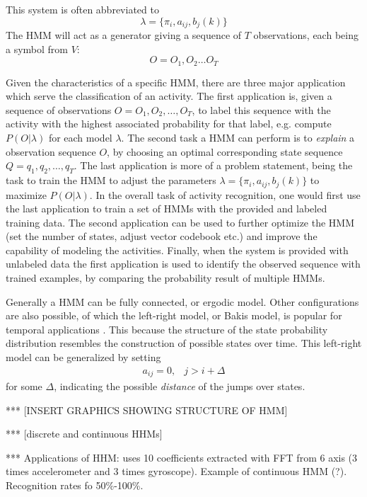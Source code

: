 This system is often abbreviated to
\begin{equation}
	\lambda = \{ \pi_i, a_{ij}, b_j(k)\}
\end{equation}
The HMM will act as a generator giving a sequence of $T$ observations, each being a symbol from $V$:
\begin{equation}
	O = O_1, O_2 \dots O_T
\end{equation}

Given the characteristics of a specific HMM, there are three major application which serve the classification of an activity.
The first application is, given a sequence of observations $O = O_1,O_2,\dots,O_T$, to label this sequence with the activity with the highest associated probability for that label, e.g. compute $P(O|\lambda)$ for each model $\lambda$.
The second task a HMM can perform is to \emph{explain} a observation sequence $O$, by choosing an optimal corresponding state sequence $Q = q_1,q_2,\dots,q_T$.
The last application is more of a problem statement, being the task to train the HMM to adjust the parameters $\lambda = \{ \pi_i, a_{ij}, b_j(k)\}$ to maximize $P(O|\lambda)$.
In the overall task of activity recognition, one would first use the last application to train a set of HMMs with the provided and labeled training data.
The second application can be used to further optimize the HMM (set the number of states, adjust vector codebook etc.) and improve the capability of modeling the activities.
Finally, when the system is provided with unlabeled data the first application is used to identify the observed sequence with trained examples, by comparing the probability result of multiple HMMs.

Generally a HMM can be fully connected, or ergodic model.
Other configurations are also possible, of which the left-right model, or Bakis model, is popular for temporal applications \cite{rabiner1989tutorial}.
This because the structure of the state probability distribution resembles the construction of possible states over time.
This left-right model can be generalized by setting
\begin{eqnarray}
	a_{ij} = 0, & j > i + \Delta
\end{eqnarray}
for some $\Delta$, indicating the possible \emph{distance} of the jumps over states.

*** [INSERT GRAPHICS SHOWING STRUCTURE OF HMM]

*** [discrete and continuous HHMs]

*** Applications of HHM: \cite{shi2009towards} uses 10 coefficients extracted with FFT from 6 axis (3 times accelerometer and 3 times gyroscope).
Example of continuous HMM (?).
Recognition rates fo 50\%-100\%.

